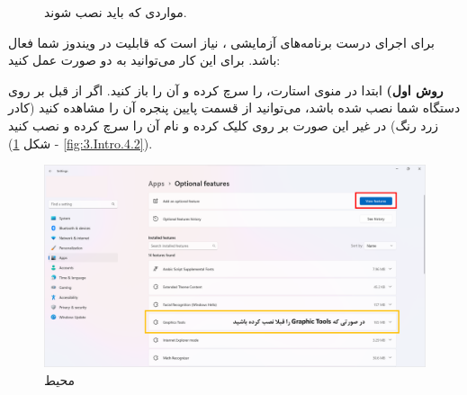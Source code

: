 {\begin{spacing}{1.5}
\begin{figure}[H]
            \caption*{مواردی که باید نصب شوند.}
        \end{figure}
    \end{spacing}
}
\textbf{\vspace{12pt}}

\title{
    \Large
}
\textbf{\vspace{-10pt}}

{
    \Large
    \begin{spacing}{1.5}
        برای اجرای درست برنامه‌های آزمایشی ، نیاز است که قابلیت  در ویندوز شما فعال باشد.
        برای این کار می‌توانید به دو صورت عمل کنید:

        \textbf{روش اول)}
        ابتدا در منوی استارت،  را سرچ کرده و آن را باز کنید.
        اگر  از قبل بر روی دستگاه شما نصب شده باشد، می‌توانید از قسمت پایین پنجره آن را مشاهده کنید (کادر زرد رنگ)
        در غیر این صورت بر روی  کلیک کرده و نام آن را سرچ کرده و نصب کنید (شکل \ref{fig:3.Intro.4.1} - \ref{fig:3.Intro.4.2}).

        \begin{figure}[H]
            \centering
            \setlength{\belowcaptionskip}{-10pt}
            \includegraphics[width=\textwidth]{Images/3/3.Intro.4.1}
            \caption{محیط }
            \label{fig:3.Intro.4.1}
        \end{figure}


\end{spacing}}
